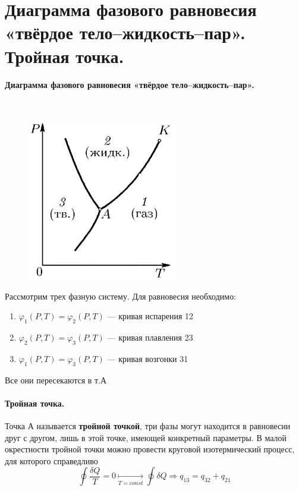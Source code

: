 \section{\normalsize Диаграмма фазового равновесия «твёрдое тело--жидкость--пар». Тройная точка.}
\paragraph{Диаграмма фазового равновесия «твёрдое тело--жидкость--пар».}$\;$\\
\begin{minipage}{75mm}
	\begin{figure}[H]
		\includegraphics[width=65mm]{ris17.png}
	\end{figure}
\end{minipage}
\begin{minipage}{100mm}
	Рассмотрим трех фазную систему. Для равновесия необходимо:
	\begin{enumerate}[(1)]
		\item $\varphi_1(P,T)=\varphi_2(P,T)$ --- кривая испарения 12
		\item $\varphi_2(P,T)=\varphi_3(P,T)$ --- кривая плавления 23
		\item $\varphi_1(P,T)=\varphi_3(P,T)$ --- кривая возгонки 31
	\end{enumerate}
	Все они пересекаются в т.А
\end{minipage}
\paragraph{Тройная точка.}
Точка А называется \textbf{тройной точкой}, три фазы могут находится в равновесии друг с другом, лишь в этой точке, имеющей конкретный параметры. В малой окрестности тройной точки можно провести круговой изотермический процесс, для которого справедливо
$$\oint\dfrac{\delta Q}{T}=0\underset{T=const}{\longmapsto}\oint\delta Q \Rightarrow q_\text{13}=q_\text{32}+q_\text{21}$$
